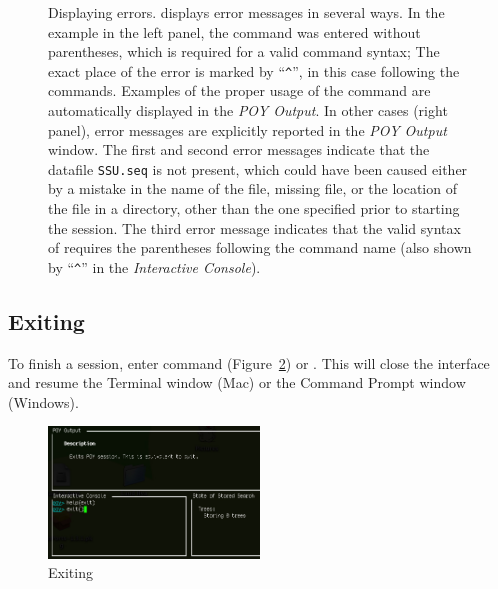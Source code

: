 \begin{figure}
\caption{Displaying errors. \poy displays error messages in several ways. In the example in the left panel, the command  was entered without parentheses, which is required for a  valid \poy command syntax; The exact place of the error is marked by ``\texttt{\^}'', in this case  following the  commands. Examples of the proper usage of the command are automatically displayed in the \emph{POY Output}. In other cases (right panel), error messages are explicitly reported in the \emph{POY Output} window. The first and second error messages indicate that the datafile \texttt{SSU.seq} is not present, which could have been caused either by a mistake in the name of the file, missing file, or the location of the file in a directory, other than the one specified prior to starting the \poy session. The third error message indicates that the valid syntax of  requires the parentheses following the command name (also shown by ``\texttt{\^}'' in  the \emph{Interactive Console}).}
\label{fig:errors}
\end{figure}

\subsection{Exiting}
To finish a \poy session, enter command  (Figure~\ref{fig:exithelp}) or . This will close the \poy interface and resume the Terminal window (Mac) or the Command Prompt window (Windows).

\begin{figure}[]
    \begin{center}
        \includegraphics[width=0.5\textwidth]{figures/exithelp.jpg}
    \end{center}
    \caption{Exiting \poy}
    \label{fig:exithelp}
\end{figure}

